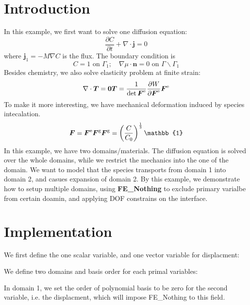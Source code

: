\hypertarget{growth_Introduction}{}\section{Introduction}\label{growth_Introduction}
In this example, we first want to solve one diffusion equation\+: \[ \frac{\partial C}{\partial t}+\nabla\cdot\boldsymbol{j}=0 \] where $\boldsymbol{j}_1=-M\nabla C$ is the flux. The boundary condition is \[ C=1 \text{ on }\Gamma_1; \quad \nabla \mu\cdot\boldsymbol{n}=0 \text{ on }\Gamma \backslash \Gamma_1 \] Besides chemistry, we also solve elasticity problem at finite strain\+: \[ \nabla\cdot\boldsymbol{T} = \boldsymbol{0}\\ \boldsymbol{T}= \frac{1}{\det{\boldsymbol{F}^{\text{e}}}}\frac{\partial W}{\partial \boldsymbol{F}^{\text{e}}}\boldsymbol{F}^{\text{e}} \] To make it more interesting, we have mechanical deformation induced by species intecalation. \[ \boldsymbol{F}=\boldsymbol{F}^{\text{e}}\boldsymbol{F}^{\text{g}}\\ \boldsymbol{F}^{\text{g}}=\left(\frac{C}{C_\text{0}}\right)^{\frac{1}{3}}\mathbb{1} \] In this example, we have two domains/materials. The diffusion equation is solved over the whole domains, while we restrict the mechanics into the one of the domain. We want to model that the species transports from domain 1 into domain 2, and casues expansion of domain 2. By this example, we demonstrate how to setup multiple domains, using {\bfseries{F\+E\+\_\+\+Nothing}} to exclude primary varialbe from certain doamin, and applying D\+OF constrains on the interface.\hypertarget{growth_imple}{}\section{Implementation}\label{growth_imple}
We first define the one scalar variable, and one vector variable for displacment\+: 
\begin{DoxyCode}{0}
\end{DoxyCode}
 We define two domains and basis order for each primal variables\+: 
\begin{DoxyCode}{0}
\end{DoxyCode}
 In domain 1, we set the order of polynomial basis to be zero for the second variable, i.\+e. the displacment, which will impose F\+E\+\_\+\+Nothing to this field.

